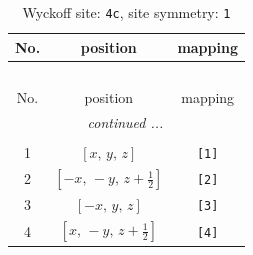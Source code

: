 \documentclass[fleqn,8pt]{jsarticle}
\begin{document}
\begin{longtable}{ccc}
\caption{Wyckoff site: {\tt 4c}, site symmetry: {\tt 1}}
 \\
 \hline \hline
No. & position & mapping \\ \hline \endfirsthead

\multicolumn{2}{l}{\tablename\ \thetable{}} \\
 \hline \hline
No. & position & mapping \\ \hline \endhead

 \hline \hline
\multicolumn{2}{r}{\footnotesize\it continued ...} \\ \endfoot

 \hline \hline
\multicolumn{2}{r}{} \\ \endlastfoot

1 & $\left[ x,\, y,\, z \right]$ & {\tt [1]} \\ \hline
2 & $\left[ - x,\, - y,\, z + \frac{1}{2} \right]$ & {\tt [2]} \\ \hline
3 & $\left[ - x,\, y,\, z \right]$ & {\tt [3]} \\ \hline
4 & $\left[ x,\, - y,\, z + \frac{1}{2} \right]$ & {\tt [4]} \\
\end{longtable}
\end{document}
